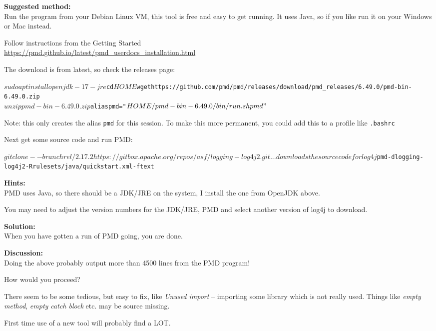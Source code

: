 \documentclass[a4paper,11pt,notitlepage]{report}
\begin{document}
{\bf Suggested method:}\\
Run the program from your Debian Linux VM, this tool is free and easy to get running. It uses Java, so if you like run it on your Windows or Mac instead.

Follow instructions from the Getting Started\\
\url{https://pmd.github.io/latest/pmd_userdocs_installation.html}

The download is from latest, so check the releases page: 

\begin{alltt}\footnotesize
$ sudo apt install openjdk-17-jre
$ cd $HOME
$ wget https://github.com/pmd/pmd/releases/download/pmd_releases/6.49.0/pmd-bin-6.49.0.zip
$ unzip pmd-bin-6.49.0.zip
$ alias pmd="$HOME/pmd-bin-6.49.0/bin/run.sh pmd"
$
\end{alltt}

Note: this only creates the alias \verb+pmd+ for this session. To make this more permanent, you could add this to a profile like \verb+.bashrc+

Next get some source code and run PMD:
\begin{alltt}\footnotesize
$ git clone --branch rel/2.17.2 https://gitbox.apache.org/repos/asf/logging-log4j2.git
... downloads the source code for log4j
$ pmd -d logging-log4j2 -R rulesets/java/quickstart.xml -f text
\end{alltt}


{\bf Hints:}\\
PMD uses Java, so there should be a JDK/JRE on the system, I install the one from OpenJDK above.

You may need to adjust the version numbers for the JDK/JRE, PMD and select another version of log4j to download.

{\bf Solution:}\\
When you have gotten a run of PMD going, you are done.

{\bf Discussion:}\\
Doing the above probably output more than 4500 lines from the PMD program!

How would you proceed?

There seem to be some tedious, but easy to fix, like \emph{Unused import} -- importing some library which is not really used. Things like \emph{empty method}, \emph{empty catch block} etc. may be source missing.

First time use of a new tool will probably find a LOT.
\end{document}
